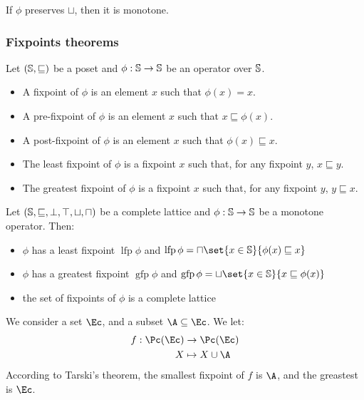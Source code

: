 \documentclass[toc, titlepaged]{../cs-classes/cs-classes}
\DeclareMathOperator{\lfp}{lfp}
\DeclareMathOperator{\gfp}{gfp}
\begin{document}
\begin{property}
    If $\phi$ preserves $\sqcup$, then it is monotone.
\end{property}

\subsubsection{Fixpoints theorems}
\begin{definition}[Fixpoints]
    Let $(\S, \sqsubseteq)$ be a poset and $\phi:\S\to\S$ be an operator over $\S$.
    \begin{itemize}
        \item A fixpoint of $\phi$ is an element $x$ such that $\phi(x)=x$.
        \item A pre-fixpoint of $\phi$ is an element $x$ such that $x\sqsubseteq\phi(x)$.
        \item A post-fixpoint of $\phi$ is an element $x$ such that $\phi(x)\sqsubseteq x$.
        \item The least fixpoint of $\phi$ is a fixpoint $x$ such that, for any fixpoint $y$, $x\sqsubseteq y$.
        \item The greatest fixpoint of $\phi$ is a fixpoint $x$ such that, for any fixpoint $y$, $y\sqsubseteq x$.
    \end{itemize}
\end{definition}

\begin{theorem}[Tarski's]
    Let $(\S, \sqsubseteq, \bot, \top, \sqcup, \sqcap)$ be a complete lattice and $\phi:\S\to\S$ be a monotone operator. Then:
    \begin{itemize}
        \item $\phi$ has a least fixpoint $\lfp\phi$ and $\lfp\phi = \sqcap\set{x\in\S}{\phi(x)\sqsubseteq x}$
        \item $\phi$ has a greatest fixpoint $\gfp\phi$ and $\gfp\phi = \sqcup\set{x\in\S}{x\sqsubseteq\phi(x)}$
        \item the set of fixpoints of $\phi$ is a complete lattice
    \end{itemize}
\end{theorem}

\begin{example}
    We consider a set $\Ec$, and a subset $\A\subseteq\Ec$. We let:
    \begin{equation*}
        \begin{aligned}
            f:\Pc(\Ec) &\to \Pc(\Ec)\\
            X &\mapsto X\cup\A
        \end{aligned}
    \end{equation*}
    According to Tarski's theorem, the smallest fixpoint of $f$ is $\A$, and the greastest is $\Ec$.
\end{example}
\end{document}

